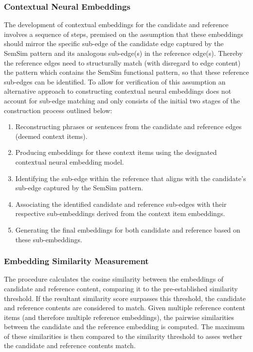 \documentclass[11pt]{scrreprt}
\begin{document}
\subsubsection{Contextual Neural Embeddings}
The development of contextual embeddings for the candidate and reference involves a sequence of steps, premised on the assumption that these embeddings should mirror the specific sub-edge of the candidate edge captured by the SemSim pattern and its analogous sub-edge(s) in the reference edge(s). Thereby the reference edges need to structurally match (with disregard to edge content) the pattern which contains the SemSim functional pattern, so that these reference sub-edges can be identified. To allow for verification of this assumption an alternative approach to constructing contextual neural embeddings does not account for sub-edge matching and only consists of the initial two stages of the construction process outlined below:

\begin{enumerate}
	\item Reconstructing phrases or sentences from the candidate and reference edges (deemed context items).
    \item Producing embeddings for these context items using the designated contextual neural embedding model.
    \item Identifying the sub-edge within the reference that aligns with the candidate's sub-edge captured by the SemSim pattern.
    \item Associating the identified candidate and reference sub-edges with their respective sub-embeddings derived from the context item embeddings.
    \item Generating the final embeddings for both candidate and reference based on these sub-embeddings.
\end{enumerate}
    
\subsubsection{Embedding Similarity Measurement}
The procedure calculates the cosine similarity between the embeddings of candidate and reference content, comparing it to the pre-established similarity threshold. If the resultant similarity score surpasses this threshold, the candidate and reference contents are considered to match. Given multiple reference content items (and therefore multiple reference embeddings), the pairwise similarities between the candidate and the reference embedding is computed. The maximum of these similarities is then compared to the similarity threshold to asses wether the candidate and reference contents match.
\end{document}
